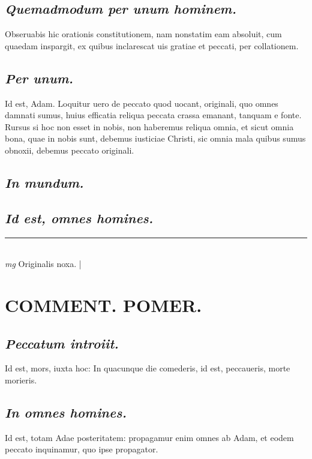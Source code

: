 \documentclass{article}
\begin{document}
\begin{pages}
\subsection*{\textit{Quemadmodum per unum hominem. }}\pstart Obseruabis hic orationis constitutionem, nam nonstatim eam absoluit, cum quaedam inspargit, ex quibus inclarescat uis gratiae et peccati, per collationem.   \pend
{}
{}
\subsection*{\textit{Per unum. }}\pstart Id est, Adam. Loquitur uero de peccato quod uocant, originali, quo omnes damnati sumus, huius efficatia reliqua peccata crassa emanant, tanquam e fonte. Rursus si hoc non esset in nobis, non haberemus reliqua omnia, et sicut omnia bona, quae in nobis sunt, debemus iusticiae Christi, sic omnia mala quibus sumus obnoxii, debemus peccato originali.   \pend
{}
{}
\subsection*{\textit{In mundum. }}
{}
\subsection*{\textit{Id est, omnes homines.  }}
\vspace{0.5cm}\noindent
\vspace{0.2cm}\rule{1cm}{0.2pt}\\ 
\hspace{0.2cm}\textit{mg}
\footnotesize Originalis noxa.  
\normalsize| 
\section*{COMMENT. POMER.  }
{}
\subsection*{\textit{Peccatum introiit. }}\pstart Id est, mors, iuxta hoc: In quacunque die comederis, id est, peccaueris, morte morieris.   \pend
{}
{}
\subsection*{\textit{In omnes homines. }}\pstart Id est, totam Adae posteritatem: propagamur enim omnes ab Adam, et eodem peccato inquinamur, quo ipse propagator.  \pend
{}
{}

\end{pages}
\end{document}
